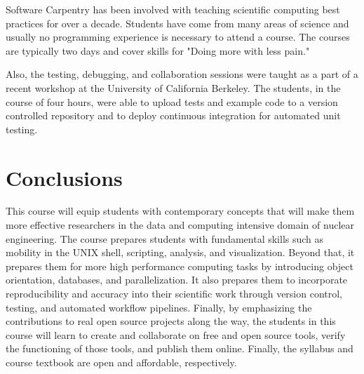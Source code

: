 \documentclass{anstrans}
\begin{document}
Software Carpentry has been involved with teaching scientific computing best
practices for over a decade. Students have come from many areas of science and
usually no programming experience is necessary to attend a course. The courses
are typically two days and cover skills for "Doing more with less pain."

Also, the testing, debugging, and collaboration sessions were taught as a part
of a recent workshop at the University of California Berkeley. The students, in
the course of four hours, were able to upload tests and example code to a
version controlled repository and to deploy continuous integration for
automated unit testing.

\section{Conclusions}

This course will equip students with contemporary concepts that will make them more
effective researchers in the data and computing intensive domain of nuclear
engineering. The course prepares students with fundamental skills such
as mobility in the UNIX shell, scripting, analysis, and visualization. Beyond
that, it prepares them for more high performance computing tasks by introducing
object orientation, databases, and parallelization. It also prepares them to
incorporate reproducibility and accuracy into their scientific work through
version control, testing, and automated workflow pipelines.  Finally, by
emphasizing the contributions to real open source projects along the way, the
students in this course will learn to create and collaborate on free and open
source tools, verify the functioning of those tools, and publish them online.
Finally, the syllabus and course textbook are open and affordable,
respectively.


 
\end{document}
